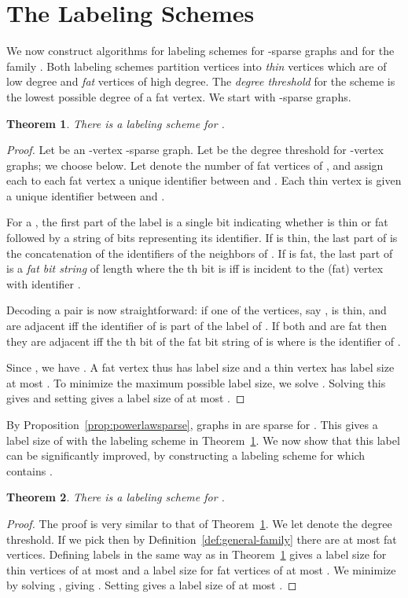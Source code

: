 \documentclass{article}
\newtheorem{theorem}{Theorem}
\theoremstyle{remark}
\begin{document}
\section{The Labeling Schemes}
\label{sec:lab_schem}
We now construct algorithms for labeling schemes for -sparse graphs and for the family . Both labeling schemes partition vertices into \emph{thin} vertices which are of low degree and \emph{fat} vertices of high degree. The \emph{degree threshold} for the scheme is the lowest possible degree of a fat vertex. We start with -sparse graphs.
\begin{theorem}\label{sparse-label}
There is a  labeling scheme for .
\end{theorem}
\begin{proof}
Let  be an -vertex -sparse graph. Let  be the degree threshold for -vertex graphs; we choose  below. Let  denote the number of fat vertices of , and assign each to each fat vertex a unique identifier between  and . Each thin vertex is given a unique identifier between  and .

For a , the first part of the label  is a single bit indicating whether  is thin or fat followed by a string of  bits representing its identifier. If  is thin, the last part of  is the concatenation of the identifiers of the neighbors of . If  is fat, the last part of  is a \emph{fat bit string} of length  where the th bit is  iff  is incident to the (fat) vertex with identifier .

Decoding a pair  is now straightforward: if one of the vertices, say , is thin,  and  are adjacent iff the identifier of  is part of the label of . If both  and  are fat then they are adjacent iff the th bit of the fat bit string of  is  where  is the identifier of .

Since , we have . A fat vertex thus has label size  and a thin vertex has label size at most . To minimize the maximum possible label size, we solve . Solving this gives  and setting  gives a label size of at most .
\end{proof}



By Proposition~\ref{prop:powerlawsparse}, graphs in  are sparse for . This gives a label size of  with the labeling scheme in Theorem~\ref{sparse-label}. We now show that this label can be significantly improved, by constructing a labeling scheme for  which contains .

\begin{theorem}\label{prop:labelingMain}
 There is a  labeling scheme for .
\end{theorem}
\begin{proof}
The proof is very similar to that of Theorem~\ref{sparse-label}. We let  denote the degree threshold. If we pick  then by Definition~\ref{def:general-family}  there are at most  fat vertices. Defining labels in the same way as in Theorem~\ref{sparse-label} gives a label size for thin vertices of at most  and a label size for fat vertices of at most
.
We minimize by solving
, giving . Setting  gives a label size of at most .
\end{proof}
\end{document}
